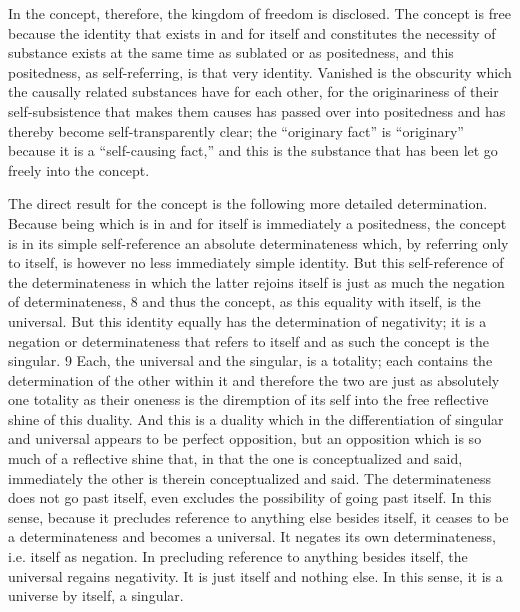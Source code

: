 In the concept, therefore, the kingdom of freedom is disclosed.
The concept is free because the identity that exists in and for itself
and constitutes the necessity of substance exists
at the same time as sublated or as positedness,
and this positedness, as self-referring, is that very identity.
Vanished is the obscurity which the causally related substances have for each other, for the
originariness of their self-subsistence that makes them causes has passed
over into positedness and has thereby become self-transparently clear;
the “originary fact” is “originary” because it is a “self-causing fact,”
and this is the substance that has been let go freely into the concept.

The direct result for the concept is the following more detailed determination.
Because being which is in and for itself is immediately a positedness,
the concept is in its simple self-reference an absolute determinateness which,
by referring only to itself, is however no less immediately simple identity.
But this self-reference of the determinateness in which the latter rejoins itself
is just as much the negation of determinateness, 8 and thus the concept, as
this equality with itself, is the universal. But this identity equally has the
determination of negativity; it is a negation or determinateness that refers
to itself and as such the concept is the singular. 9 Each, the universal and the
singular, is a totality; each contains the determination of the other within
it and therefore the two are just as absolutely one totality as their oneness
is the diremption of its self into the free reflective shine of this duality.
And this is a duality which in the differentiation of singular and universal
appears to be perfect opposition, but an opposition which is so much of a
reflective shine that, in that the one is conceptualized and said, immediately
the other is therein conceptualized and said.
The determinateness does not go past itself,
even excludes the possibility of going past itself.
In this sense, because it precludes reference to anything else besides itself,
it ceases to be a determinateness
and becomes a universal. It negates its own determinateness, i.e. itself as negation.
In precluding reference to anything besides itself,
the universal regains negativity.
It is just itself and nothing else.
In this sense, it is a universe by itself, a singular.

